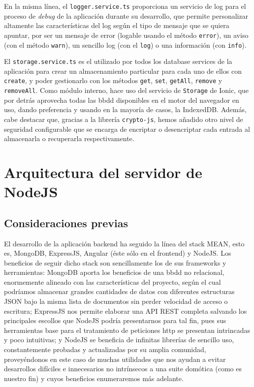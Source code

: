 \vspace{0.5cm}

En la misma línea, el \verb|logger.service.ts| proporciona un servicio de log para el proceso de \textit{debug} de la aplicación durante su desarrollo, que permite personalizar altamente las características del log según el tipo de mensaje que se quiera apuntar, por ser un mensaje de error (logable usando el método \verb|error|), un aviso (con el método \verb|warn|), un sencillo log (con el \verb|log|) o una información (con \verb|info|).

\vspace{1cm}

El \verb|storage.service.ts| es el utilizado por todos los database services de la aplicación para crear un almacenamiento particular para cada uno de ellos con \verb|create|, y poder gestionarlo con los métodos \verb|get|, \verb|set|, \verb|getAll|, \verb|remove| y \verb|removeAll|. Como módulo interno, hace uso del servicio de \verb|Storage| de Ionic, que por detrás aprovecha todas las \gls{bbdd} disponibles en el motor del navegador en uso, dando preferencia y usando en la mayoría de casos, la \gls{IndexedDB}. Además, cabe destacar que, gracias a la librería \verb|crypto-js|, hemos añadido otro nivel de seguridad configurable que se encarga de encriptar o desencriptar cada entrada al almacenarla o recuperarla respectivamente.

\section{Arquitectura del servidor de NodeJS}
\label{ch:Capitulo4.6}

\subsection{Consideraciones previas}
\label{ch:Capitulo4.6.1}

El desarrollo de la aplicación backend ha seguido la línea del stack MEAN, esto es, MongoDB, ExpressJS, Angular (éste sólo en el frontend) y NodeJS. Los beneficios de seguir dicho stack son sencillamente los de sus frameworks y herramientas: MongoDB aporta los beneficios de una \gls{bbdd} no relacional, enormemente alineado con las características del proyecto, según el cual podríamos almacenar grandes cantidades de datos con diferentes estructuras JSON bajo la misma lista de documentos sin perder velocidad de acceso o escritura; ExpressJS nos permite elaborar una API REST completa salvando los principales escollos que NodeJS podría presentarnos para tal fin, pues sus herramientas base para el tratamiento de peticiones http se presentan intrincadas y poco intuitivas; y NodeJS se beneficia de infinitas librerías de sencillo uso, constantemente probadas y actualizadas por su amplia comunidad, proveyéndonos en este caso de muchas utilidades que nos ayudan a evitar desarrollos difíciles e innecesarios no intrínsecos a una suite domótica (como es nuestro fin) y cuyos beneficios enumeraremos más adelante.


